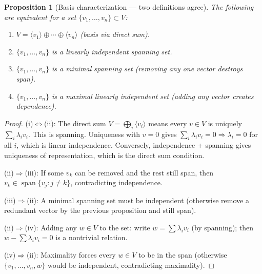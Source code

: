 \documentclass[11pt]{article}
\theoremstyle{definition}
\theoremstyle{plain}
\newtheorem{proposition}{Proposition}[section]
\begin{document}
\begin{proposition}[Basis characterization --- two definitions agree]
  The following are equivalent for a set $\{v_1,\ldots,v_n\}\subset V$:
  \begin{enumerate}[label=(\roman*)]
    \item $V = \langle v_1\rangle\oplus\cdots\oplus\langle v_n\rangle$
          (basis via direct sum).
    \item $\{v_1,\ldots,v_n\}$ is a linearly independent spanning set.
    \item $\{v_1,\ldots,v_n\}$ is a \emph{minimal} spanning set (removing
          any one vector destroys span).
    \item $\{v_1,\ldots,v_n\}$ is a \emph{maximal} linearly independent
          set (adding any vector creates dependence).
  \end{enumerate}
\end{proposition}
\begin{proof}
  (i)$\iff$(ii): The direct sum $V=\bigoplus_i\langle v_i\rangle$ means every
  $v\in V$ is uniquely $\sum_i\lambda_i v_i$.  This is spanning.  Uniqueness
  with $v=0$ gives $\sum_i\lambda_i v_i=0\Rightarrow\lambda_i=0$ for all $i$,
  which is linear independence.  Conversely, independence + spanning gives
  uniqueness of representation, which is the direct sum condition.

  (ii)$\Rightarrow$(iii): If some $v_k$ can be removed and the rest still
  span, then $v_k\in\operatorname{span}\{v_j:j\ne k\}$, contradicting independence.

  (iii)$\Rightarrow$(ii): A minimal spanning set must be independent (otherwise
  remove a redundant vector by the previous proposition and still span).

  (ii)$\Rightarrow$(iv): Adding any $w\in V$ to the set: write $w=\sum\lambda_i v_i$
  (by spanning); then $w - \sum\lambda_i v_i = 0$ is a nontrivial relation.

  (iv)$\Rightarrow$(ii): Maximality forces every $w\in V$ to be in the span
  (otherwise $\{v_1,\ldots,v_n,w\}$ would be independent, contradicting maximality).
\end{proof}
\end{document}
